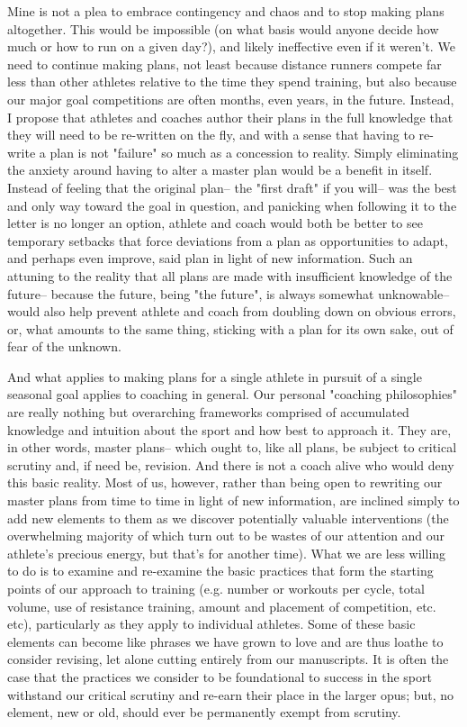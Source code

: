 Mine is not a plea to embrace contingency and chaos and to stop making plans altogether. This would be impossible (on what basis would anyone decide how much or how to run on a given day?), and likely ineffective even if it weren't. We need to continue making plans, not least because distance runners compete far less than other athletes relative to the time they spend training, but also because our major goal competitions are often months, even years, in the future. Instead, I propose that athletes and coaches author their plans in the full knowledge that they will need to be re-written on the fly, and with a sense that having to re-write a plan is not "failure" so much as a concession to reality. Simply eliminating the anxiety around having to alter a master plan would be a benefit in itself. Instead of feeling that the original plan-- the "first draft" if you will-- was the best and only way toward the goal in question, and panicking when following it to the letter is no longer an option, athlete and coach would both be better to see temporary setbacks that force deviations from a plan as opportunities to adapt, and perhaps even improve, said plan in light of new information. Such an attuning to the reality that all plans are made with insufficient knowledge of the future-- because the future, being "the future", is always somewhat unknowable-- would also help prevent athlete and coach from doubling down on obvious errors, or, what amounts to the same thing, sticking with a plan for its own sake, out of fear of the unknown.

And what applies to making plans for a single athlete in pursuit of a single seasonal goal applies to coaching in general. Our personal "coaching philosophies" are really nothing but overarching frameworks comprised of accumulated knowledge and intuition about the sport and how best to approach it. They are, in other words, master plans-- which ought to, like all plans, be subject to critical scrutiny and, if need be, revision. And there is not a coach alive who would deny this basic reality. Most of us, however, rather than being open to rewriting our master plans from time to time in light of new information, are inclined simply to add new elements to them as we discover potentially valuable interventions (the overwhelming majority of which turn out to be wastes of our attention and our athlete's precious energy, but that's for another time). What we are less willing to do is to examine and re-examine the basic practices that form the starting points of our approach to training (e.g. number or workouts per cycle, total volume, use of resistance training, amount and placement of competition, etc. etc), particularly as they apply to individual athletes. Some of these basic elements can become like phrases we have grown to love and are thus loathe to consider revising, let alone cutting entirely from our manuscripts. It is often the case that the practices we consider to be foundational to success in the sport withstand our critical scrutiny and re-earn their place in the larger opus; but, no element, new or old, should ever be permanently exempt from scrutiny.

